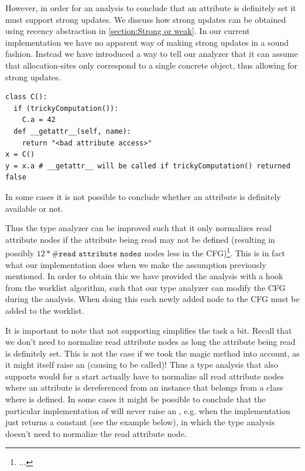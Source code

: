 However, in order for an analysis to conclude that an attribute is definitely set it must support strong updates. We discuss how strong updates can be obtained using recency abstraction in \autoref{section:Strong or weak}. In our current implementation we have no apparent way of making strong updates in a sound fashion. Instead we have introduced a way to tell our analyzer that it can assume that allocation-sites only correspond to a single concrete object, thus allowing for strong updates.

\begin{listing}[H]
  \begin{verbatim}
class C():
  if (trickyComputation()):
    C.a = 42
  def __getattr__(self, name):
    return "<bad attribute access>"
x = C()
y = x.a # __getattr__ will be called if trickyComputation() returned false
  \end{verbatim}
  \caption{In some cases it is not possible to conclude whether an attribute is definitely available or not.}
  \label{ex:DefinitelyAvailable}
\end{listing}

Thus the type analyzer can be improved such that it only normalizes read attribute nodes if the attribute being read may not be defined (resulting in possibly $12 * \#\texttt{read attribute nodes}$ nodes less in the CFG)\footnote{...}. This is in fact what our implementation does when we make the assumption previously mentioned. In order to obtain this we have provided the analysis with a hook from the worklist algorithm, such that our type analyzer can modify the CFG during the analysis. When doing this each newly added node to the CFG must be added to the worklist.

It is important to note that not supporting  simplifies the task a bit. Recall that we don't need to normalize read attribute nodes as long the attribute being read is definitely set. This is not the case if we took the magic method  into account, as it might itself raise an  (causing  to be called)! Thus a type analysis that also supports  would for a start actually have to normalize all read attribute nodes where an attribute is dereferenced from an instance that belongs from a class where  is defined. In some cases it might be possible to conclude that the particular implementation of  will never raise an , e.g. when the implementation just returns a constant (see the example below), in which the type analysis doesn't need to normalize the read attribute node.


